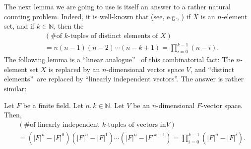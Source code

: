The next lemma we are going to use is itself an answer to a rather natural
counting problem. Indeed, it is well-known that (see, e.g., \cite[Proposition
2.7.2]{19fco}) if $X$ is an $n$-element set, and if $k\in\mathbb{N}$, then
the
\begin{align}
&  \left(  \text{\# of }k\text{-tuples of distinct elements of }X\right)
\nonumber\\
&  =n\left(  n-1\right)  \left(  n-2\right)  \cdots\left(  n-k+1\right)
=\prod_{i=0}^{k-1}\left(  n-i\right)  . \label{eq.count.k-tups-dist-elts}%
\end{align}
The following lemma is a \textquotedblleft linear analogue\textquotedblright%
\ of this combinatorial fact: The $n$-element set $X$ is replaced by an
$n$-dimensional vector space $V$, and \textquotedblleft distinct
elements\textquotedblright\ are replaced by \textquotedblleft linearly
independent vectors\textquotedblright. The answer is rather similar:

\begin{lemma}
\label{lem.pars.qbinom.lin-ind-count}Let $F$ be a finite field. Let
$n,k\in\mathbb{N}$. Let $V$ be an $n$-dimensional $F$-vector space. Then,%
\begin{align*}
&  \left(  \text{\# of linearly independent }k\text{-tuples of vectors in
}V\right) \\
&  =\left(  \left\vert F\right\vert ^{n}-\left\vert F\right\vert ^{0}\right)
\left(  \left\vert F\right\vert ^{n}-\left\vert F\right\vert ^{1}\right)
\cdots\left(  \left\vert F\right\vert ^{n}-\left\vert F\right\vert
^{k-1}\right)  =\prod_{i=0}^{k-1}\left(  \left\vert F\right\vert
^{n}-\left\vert F\right\vert ^{i}\right)  .
\end{align*}

\end{lemma}

